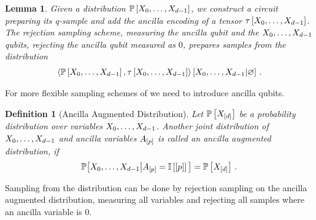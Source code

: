 \documentclass[aps,onecolumn,nofootinbib,pra]{article}
\newtheorem{lemma}{Lemma}
\newtheorem{definition}{Definition}
\newcommand{\red}[1]{\textcolor{red}{#1}}
\begin{document}
    \begin{lemma}
        Given a distribution $\mathbb{P}\left[X_{0},\ldots,X_{d-1}\right]$, we construct a circuit preparing its q-sample and add the ancilla encoding of a tensor $\tau\left[X_{0},\ldots,X_{d-1}\right]$.
        The rejection sampling scheme, measuring the ancilla qubit and the $X_{0},\ldots,X_{d-1}$ qubits, rejecting the ancilla qubit measured as $0$, prepares samples from the distribution
        \begin{align*}
            \left\langle \mathbb{P}\left[X_{0},\ldots,X_{d-1}\right],\tau\left[X_{0},\ldots,X_{d-1}\right]\right\rangle \left[ X_{0},\ldots,X_{d-1} | \varnothing \right] \, .
        \end{align*}
    \end{lemma}

    For more flexible sampling schemes of \ComputationActivationNetworks{} we need to introduce ancilla qubits.

    \begin{definition}[Ancilla Augmented Distribution]
        Let $\mathbb{P}\left[X_{[d]}\right]$ be a probability distribution over variables $X_{0},\ldots,X_{d-1}$.
        Another joint distribution of $X_{0},\ldots,X_{d-1}$ and ancilla variables $A_{[p]}$ is called an ancilla augmented distribution, if
        \begin{align*}
            \mathbb{P}\big[X_{0},\ldots,X_{d-1}\big|A_{[p]}=\mathbb{I}\left[[p]\right]\big] = \mathbb{P}\left[X_{[d]}\right] \, .
        \end{align*}
    \end{definition}

    Sampling from the distribution can be done by rejection sampling on the ancilla augmented distribution, measuring all variables and rejecting all samples where an ancilla variable is $0$.

\end{document}
